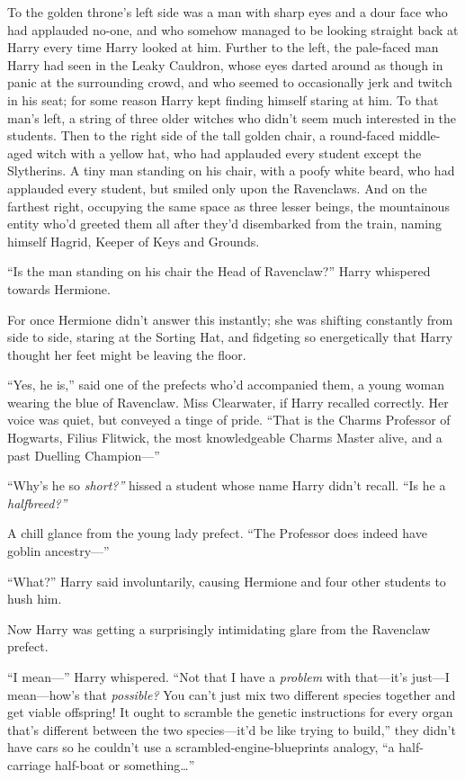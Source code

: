 To the golden throne's left side was a man with sharp eyes and a dour
face who had applauded no-one, and who somehow managed to be looking
straight back at Harry every time Harry looked at him. Further to the
left, the pale-faced man Harry had seen in the Leaky Cauldron, whose
eyes darted around as though in panic at the surrounding crowd, and who
seemed to occasionally jerk and twitch in his seat; for some reason
Harry kept finding himself staring at him. To that man's left, a string
of three older witches who didn't seem much interested in the students.
Then to the right side of the tall golden chair, a round-faced
middle-aged witch with a yellow hat, who had applauded every student
except the Slytherins. A tiny man standing on his chair, with a poofy
white beard, who had applauded every student, but smiled only upon the
Ravenclaws. And on the farthest right, occupying the same space as three
lesser beings, the mountainous entity who'd greeted them all after
they'd disembarked from the train, naming himself Hagrid, Keeper of Keys
and Grounds.

``Is the man standing on his chair the Head of Ravenclaw?'' Harry
whispered towards Hermione.

For once Hermione didn't answer this instantly; she was shifting
constantly from side to side, staring at the Sorting Hat, and fidgeting
so energetically that Harry thought her feet might be leaving the floor.

``Yes, he is,'' said one of the prefects who'd accompanied them, a young
woman wearing the blue of Ravenclaw. Miss Clearwater, if Harry recalled
correctly. Her voice was quiet, but conveyed a tinge of pride. ``That is
the Charms Professor of Hogwarts, Filius Flitwick, the most
knowledgeable Charms Master alive, and a past Duelling Champion---''

``Why's he so \emph{short?''} hissed a student whose name Harry didn't
recall. ``Is he a \emph{halfbreed?''}

A chill glance from the young lady prefect. ``The Professor does indeed
have goblin ancestry---''

``What?'' Harry said involuntarily, causing Hermione and four other
students to hush him.

Now Harry was getting a surprisingly intimidating glare from the
Ravenclaw prefect.

``I mean---'' Harry whispered. ``Not that I have a \emph{problem} with
that---it's just---I mean---how's that \emph{possible?} You can't just
mix two different species together and get viable offspring! It ought to
scramble the genetic instructions for every organ that's different
between the two species---it'd be like trying to build,'' they didn't
have cars so he couldn't use a scrambled-engine-blueprints analogy, ``a
half-carriage half-boat or something\ldots{}''

